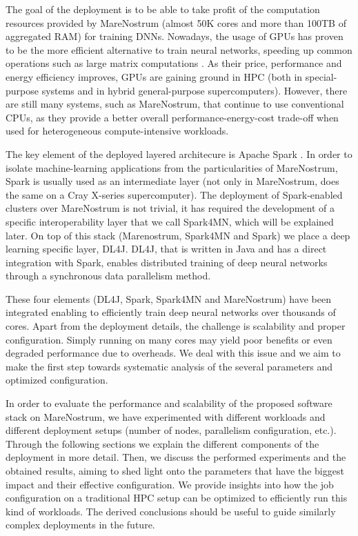 \documentclass[journal]{IEEEtran}
\begin{document}
The goal of the deployment is to be able to take profit of the computation resources provided by MareNostrum (almost 50K cores and more than 100TB of aggregated RAM) for training DNNs. Nowadays, the usage of GPUs has proven to be the more efficient alternative to train neural networks, speeding up common operations such as large matrix computations \cite{DBLP:conf/isca/LeeKCDKNSSCHSD10, conf/ipps/Fujimoto08}. As their price, performance and energy efficiency improves, GPUs are gaining ground in HPC (both in special-purpose systems and in hybrid general-purpose supercomputers). However, there are still many systems, such as MareNostrum, that continue to use conventional CPUs, as they provide a better overall performance-energy-cost trade-off when used for heterogeneous compute-intensive workloads. 

The key element of the deployed layered architecure is Apache Spark \cite{spark}. In order to isolate machine-learning applications from the particularities of MareNostrum, Spark is usually used as an intermediate layer (not only in MareNostrum, \cite{wang2014} does the same on a Cray X-series supercomputer). The deployment of Spark-enabled clusters over MareNostrum is not trivial, it has required the development of a specific interoperability layer that we call Spark4MN, which will be explained later. On top of this stack (Marenostrum, Spark4MN and Spark) we place a deep learning specific layer, DL4J. DL4J, that is written in Java and has a direct integration with Spark, enables distributed training of deep neural networks through a synchronous data parallelism method. 

These four elements (DL4J, Spark, Spark4MN and MareNostrum) have been integrated enabling to efficiently train deep neural networks over thousands of cores. Apart from the deployment details, the challenge is scalability and proper configuration. Simply running on many cores may yield poor benefits or even degraded performance due to overheads. We deal with this issue and we aim to make the first step towards systematic analysis of the several parameters and optimized configuration.

In order to evaluate the performance and scalability of the proposed software stack on MareNostrum, we have experimented with different workloads and different deployment setups (number of nodes, parallelism configuration, etc.). Through the following sections we explain the different components of the deployment in more detail. Then, we discuss the performed experiments and the obtained results, aiming to shed light onto the parameters that have the biggest impact and their effective configuration. We provide insights into how the job configuration on a traditional HPC setup can be optimized to efficiently run this kind of workloads. The derived conclusions should be useful to guide similarly complex deployments in the future.
\end{document}
